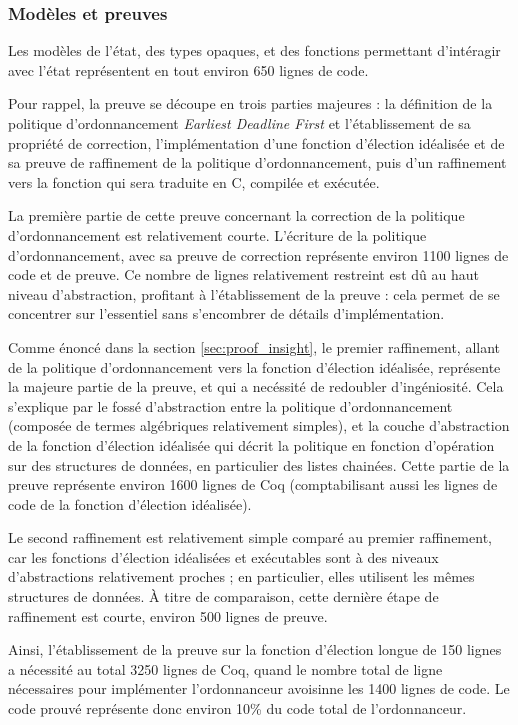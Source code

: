 			\subsubsection{Modèles et preuves}
			
			Les modèles de l'état, des types opaques, et des fonctions permettant d'intéragir avec l'état représentent en tout environ 650 lignes de code.

			Pour rappel, la preuve se découpe en trois parties majeures : la définition de la politique d'ordonnancement \emph{Earliest Deadline First} et l'établissement de sa propriété de correction, l'implémentation d'une fonction d'élection idéalisée et de sa preuve de raffinement de la politique d'ordonnancement, puis d'un raffinement vers la fonction qui sera traduite en C, compilée et exécutée.

			La première partie de cette preuve concernant la correction de la politique d'ordonnancement est relativement courte. L'écriture de la politique d'ordonnancement, avec sa preuve de correction représente environ 1100 lignes de code et de preuve. Ce nombre de lignes relativement restreint est dû au haut niveau d'abstraction, profitant à l'établissement de la preuve : cela permet de se concentrer sur l'essentiel sans s'encombrer de détails d'implémentation.
		
			Comme énoncé dans la section \ref{sec:proof_insight}, le premier raffinement, allant de la politique d'ordonnancement vers la fonction d'élection idéalisée, représente la majeure partie de la preuve, et qui a necéssité de redoubler d'ingéniosité. Cela s'explique par le fossé d'abstraction entre la politique d'ordonnancement (composée de termes algébriques relativement simples), et la couche d'abstraction de la fonction d'élection idéalisée qui décrit la politique en fonction d'opération sur des structures de données, en particulier des listes chainées. Cette partie de la preuve représente environ 1600 lignes de Coq (comptabilisant aussi les lignes de code de la fonction d'élection idéalisée).

			Le second raffinement est relativement simple comparé au premier raffinement, car les fonctions d'élection idéalisées et exécutables sont à des niveaux d'abstractions relativement proches ; en particulier, elles utilisent les mêmes structures de données. À titre de comparaison, cette dernière étape de raffinement est courte, environ 500 lignes de preuve.

			Ainsi, l'établissement de la preuve sur la fonction d'élection longue de 150 lignes a nécessité au total 3250 lignes de Coq, quand le nombre total de ligne nécessaires pour implémenter l'ordonnanceur avoisinne les 1400 lignes de code. Le code prouvé représente donc environ 10\% du code total de l'ordonnanceur.


